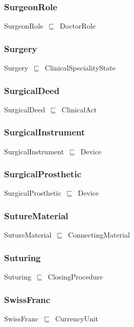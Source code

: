 \documentclass{article}
\begin{document}
\subsubsection*{SurgeonRole}

SurgeonRole~\ensuremath{\sqsubseteq}~DoctorRole~

\subsubsection*{Surgery}

Surgery~\ensuremath{\sqsubseteq}~ClinicalSpecialityState~

\subsubsection*{SurgicalDeed}

SurgicalDeed~\ensuremath{\sqsubseteq}~ClinicalAct~

\subsubsection*{SurgicalInstrument}

SurgicalInstrument~\ensuremath{\sqsubseteq}~Device~

\subsubsection*{SurgicalProsthetic}

SurgicalProsthetic~\ensuremath{\sqsubseteq}~Device~

\subsubsection*{SutureMaterial}

SutureMaterial~\ensuremath{\sqsubseteq}~ConnectingMaterial~

\subsubsection*{Suturing}

Suturing~\ensuremath{\sqsubseteq}~ClosingProcedure~

\subsubsection*{SwissFranc}

SwissFranc~\ensuremath{\sqsubseteq}~CurrencyUnit~
\end{document}
